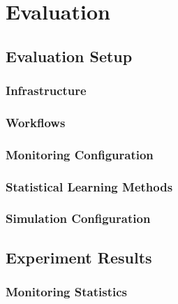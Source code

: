 \section{Evaluation}
\label{cha:evaluation}

\subsection{Evaluation Setup}
\label{sec:evaluation_setup}

\subsubsection{Infrastructure}
\label{sec:evaluation_infrastructure}

\subsubsection{Workflows}
\label{sec:evaluation_workflows}

\subsubsection{Monitoring Configuration}
\label{sec:evaluation_monitoring_configuration}

\subsubsection{Statistical Learning Methods}
\label{sec:evaluation_statistical_learning_methods}

\subsubsection{Simulation Configuration}
\label{sec:evaluation_simulation_configuration}

\subsection{Experiment Results}
\label{sec:experiment_results}

\subsubsection{Monitoring Statistics}
\label{sec:monitoring_statistics}

